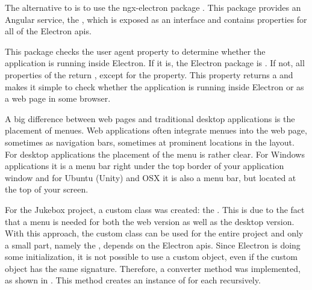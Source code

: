 
The alternative to  is to use the ngx-electron package \cite{ngxElectron}. This package provides an Angular service, the , which is exposed as an interface and contains properties for all of the Electron \gls{api}s.

This package checks the user agent property to determine whether the application is running inside Electron. If it is, the Electron package is . If not, all properties of the  return , except for the  property. This property returns a  and makes it simple to check whether the application is running inside Electron or as a web page in some browser.


A big difference between web pages and traditional desktop applications is the placement of menues. Web applications often integrate menues into the web page, sometimes as navigation bars, sometimes at prominent locations in the layout. For desktop applications the placement of the menu is rather clear. For Windows applications it is a menu bar right under the top border of your application window and for Ubuntu (Unity) and OSX it is also a menu bar, but located at the top of your screen.



For the Jukebox project, a custom  class was created: the . This is due to the fact that a menu is needed for both the web version as well as the desktop version. With this approach, the custom class can be used for the entire project and only a small part, namely the , depends on the Electron \gls{api}s. Since Electron is doing some initialization, it is not possible to use a custom  object, even if the custom object has the same signature. Therefore, a converter method was implemented, as shown in . This method creates an instance of  for each  recursively.


\newpage


